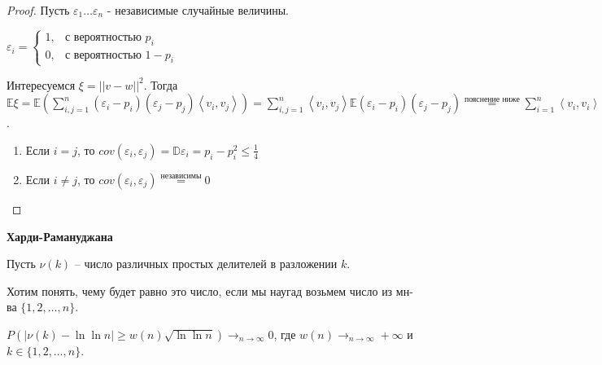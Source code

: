 \begin{proof}
    Пусть $\varepsilon_1 \ldots \varepsilon_n$ - независимые случайные величины.

    $
    \varepsilon_{i} =
    \begin{cases}
        1, & \text{с вероятностью $p_i$} \\
        0, & \text{с вероятностью $1 - p_i$}
    \end{cases}
    $

    Интересуемся $\xi = || v - w ||^2$. Тогда $\mathbb{E} \xi = \mathbb{E} (\sum_{i, j = 1}^n (\varepsilon_i - p_i)(\varepsilon_j - p_j) \left < v_i, v_j \right > ) =
    \sum_{i, j = 1}^{n} \left < v_i, v_j \right > \mathbb{E} (\varepsilon_i - p_i)(\varepsilon_j - p_j) \overset{\text{пояснение ниже}}{=} \sum_{i = 1}^{n} \left < v_i, v_i \right > (p_i - p_i^2) \leqslant \frac{n}{4}$.

    \begin{enumerate}
        \item Если $i = j$, то $cov(\varepsilon_i, \varepsilon_j) = \mathbb{D}\varepsilon_i = p_i - p_i^2 \leqslant \frac{1}{4}$
        \item Если $i \neq j$, то $cov (\varepsilon_i, \varepsilon_j) \overset{\text{независимы}}{=} 0$
    \end{enumerate}
\end{proof}


    \begin{theorem}
        \textbf{Харди-Рамануджана}

        Пусть $\nu (k)$ -- число различных простых делителей в разложении $k$. 
        
        Хотим понять, чему будет равно это число, если мы наугад возьмем число из мн-ва $\{1, 2, \ldots, n\}$.

        $P(| \nu (k) - \ln \ln n| \geqslant w(n) \sqrt{\ln \ln n}) \to_{n \to \infty} 0$, где $w(n) \to_{n \to \infty} +\infty$ и $k \in \{1, 2, \ldots, n\}$. 
    \end{theorem}

